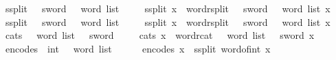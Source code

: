 \begin{isabellebody}
\isanewline
{}\isamarkupfalse%
\ s{}{}{\isacharunderscore}{\kern0pt}split\ {\isacharcolon}{\kern0pt}{\isacharcolon}{\kern0pt}\ {\isachardoublequoteopen}{}{}\ sword\ {\isasymRightarrow}\ {}{}\ word\ list{\isachardoublequoteclose}\isanewline
\ \ \isanewline
\ \ {\isachardoublequoteopen}s{}{}{\isacharunderscore}{\kern0pt}split\ x\ {\isasymequiv}\ {\isacharparenleft}{\kern0pt}word{\isacharunderscore}{\kern0pt}rsplit\ {\isacharcolon}{\kern0pt}{\isacharcolon}{\kern0pt}\ {}{}\ sword\ {\isasymRightarrow}\ {}{}\ word\ list{\isacharparenright}{\kern0pt}\ x{\isachardoublequoteclose}\isanewline
\isanewline
{}\isamarkupfalse%
\ s{}{}{\isacharunderscore}{\kern0pt}split\ {\isacharcolon}{\kern0pt}{\isacharcolon}{\kern0pt}\ {\isachardoublequoteopen}{}{}\ sword\ {\isasymRightarrow}\ {}\ word\ list{\isachardoublequoteclose}\isanewline
\ \ \isanewline
\ \ {\isachardoublequoteopen}s{}{}{\isacharunderscore}{\kern0pt}split\ x\ {\isasymequiv}\ {\isacharparenleft}{\kern0pt}word{\isacharunderscore}{\kern0pt}rsplit\ {\isacharcolon}{\kern0pt}{\isacharcolon}{\kern0pt}\ {}{}\ sword\ {\isasymRightarrow}\ {}\ word\ list{\isacharparenright}{\kern0pt}\ x{\isachardoublequoteclose}\isanewline
\isanewline
{}\isamarkupfalse%
\ cat{\isacharunderscore}{\kern0pt}s{}{}\ {\isacharcolon}{\kern0pt}{\isacharcolon}{\kern0pt}\ {\isachardoublequoteopen}{}\ word\ list\ {\isasymRightarrow}\ {}{}\ sword{\isachardoublequoteclose}\isanewline
\ \ \isanewline
\ \ {\isachardoublequoteopen}cat{\isacharunderscore}{\kern0pt}s{}{}\ x\ {\isasymequiv}\ {\isacharparenleft}{\kern0pt}word{\isacharunderscore}{\kern0pt}rcat\ {\isacharcolon}{\kern0pt}{\isacharcolon}{\kern0pt}\ {}\ word\ list\ {\isasymRightarrow}\ {}{}\ sword{\isacharparenright}{\kern0pt}\ x{\isachardoublequoteclose}\isanewline
\isanewline
{}\isamarkupfalse%
\ encode{\isacharunderscore}{\kern0pt}s{}{}\ {\isacharcolon}{\kern0pt}{\isacharcolon}{\kern0pt}\ {\isachardoublequoteopen}int\ {\isasymRightarrow}\ {}\ word\ list{\isachardoublequoteclose}\isanewline
\ \ \ \isanewline
\ \ {\isachardoublequoteopen}encode{\isacharunderscore}{\kern0pt}s{}{}\ x\ {\isasymequiv}\ s{}{}{\isacharunderscore}{\kern0pt}split\ {\isacharparenleft}{\kern0pt}word{\isacharunderscore}{\kern0pt}of{\isacharunderscore}{\kern0pt}int\ x{\isacharparenright}{\kern0pt}{\isachardoublequoteclose}\isanewline

\end{isabellebody}
